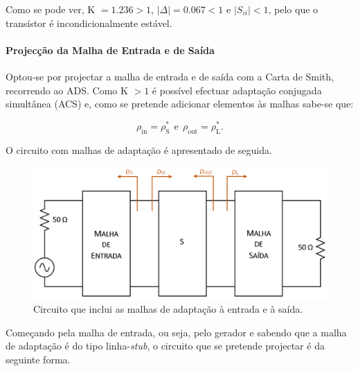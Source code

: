\documentclass[11pt]{article}
\numberwithin{equation}{section}
\begin{document}
\vspace{1mm} 
Como se pode ver, K $= 1.236 > 1$, $\lvert \Delta \rvert = 0.067 < 1$ e $\lvert S_{ii} \rvert < 1$, pelo que o transístor é incondicionalmente estável.

\paragraph{Projecção da Malha de Entrada e de Saída} \hspace{0pt} 

Optou-se por projectar a malha de entrada e de saída com a Carta de Smith, recorrendo ao ADS. Como K $ > 1$ é possível efectuar adaptação conjugada simultânea (ACS) e, como se pretende adicionar elementos às malhas sabe-se que:

\vspace{-3mm}
\begin{equation}
\rho_{\text{in}} = \rho_{\text{S}}^{*} ~~ \text{e} ~~ \rho_{\text{out}} = \rho_{\text{L}}^{*}.
\end{equation}

\vspace{1mm} 
O circuito com malhas de adaptação é apresentado de seguida.

\begin{figure}[H]
	\centering
	\includegraphics[keepaspectratio=true, scale=0.35]{teoricas/malhas}
	\vspace{-0.5em}
	\caption{Circuito que inclui as malhas de adaptação à entrada e à saída.}
	\vspace{-0.8em}
\end{figure}

Começando pela malha de entrada, ou seja, pelo gerador e sabendo que a malha de adaptação é do tipo linha-\textit{stub}, o circuito que se pretende projectar é da seguinte forma.
\end{document}
